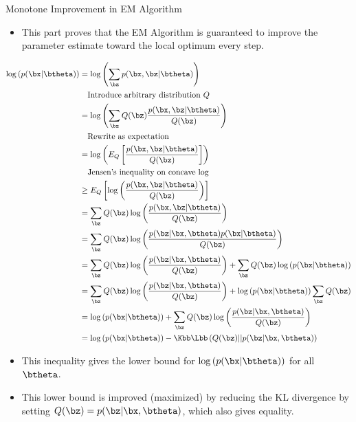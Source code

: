 \documentclass[dvipdfmx,bigger,aspectratio=169]{beamer}
\begin{document}
\begin{frame}[allowframebreaks,label=,t]{Monotone Improvement in EM Algorithm}
\begin{itemize}
\item This part proves that the EM Algorithm is guaranteed to improve the parameter estimate toward the local optimum every step. \cite{doWhatExpectationMaximization2008,murphyMachineLearningProbabilistic2012}
\end{itemize}
\footnotesize
\begin{align*}
  \log \left( p(\bx | \btheta) \right)
  &= \log \left( \sum_{\bz} p(\bx, \bz | \btheta) \right)\\
  &~~~\text{Introduce arbitrary distribution $Q$}\\
  &= \log \left( \sum_{\bz} Q(\bz) \frac{p(\bx, \bz | \btheta)}{Q(\bz)} \right)\\
  &~~~\text{Rewrite as expectation}\\
  &= \log \left( E_{Q} \left[ \frac{p(\bx, \bz | \btheta)}{Q(\bz)} \right] \right)\\
  &~~~\text{Jensen's inequality on concave log}\\
  &\ge E_{Q} \left[ \log \left( \frac{p(\bx, \bz | \btheta)}{Q(\bz)} \right) \right]\\
  &= \sum_{\bz} Q(\bz) \log \left( \frac{p(\bx, \bz | \btheta)}{Q(\bz)} \right)\\
  &= \sum_{\bz} Q(\bz) \log \left( \frac{p(\bz | \bx, \btheta) p(\bx | \btheta)}{Q(\bz)} \right)\\
  &= \sum_{\bz} Q(\bz) \log \left( \frac{p(\bz | \bx, \btheta)}{Q(\bz)} \right) + \sum_{\bz} Q(\bz) \log \left( p(\bx | \btheta) \right)\\
  &= \sum_{\bz} Q(\bz) \log \left( \frac{p(\bz | \bx, \btheta)}{Q(\bz)} \right) + \log \left( p(\bx | \btheta) \right) \sum_{\bz} Q(\bz)\\
  &= \log \left( p(\bx | \btheta) \right) + \sum_{\bz} Q(\bz) \log \left( \frac{p(\bz | \bx, \btheta)}{Q(\bz)} \right)\\
  &= \log \left( p(\bx | \btheta) \right) - \Kbb\Lbb \left( Q(\bz) || p(\bz | \bx, \btheta) \right)
\end{align*}
\normalsize
\begin{itemize}
\item This inequality gives the lower bound for \(\log \left( p(\bx | \btheta) \right)\) for all \(\btheta\).
\item This lower bound is improved (maximized) by reducing the KL divergence \cite{murphyMachineLearningProbabilistic2012} by setting \(Q(\bz) = p(\bz | \bx, \btheta)\), which also gives equality.

\end{itemize}
\end{frame}
\end{document}
